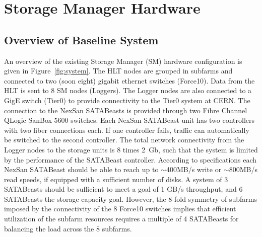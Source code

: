 
\section{\label{sec:stohard}Storage Manager Hardware}  %

\subsection{Overview of Baseline System} 
An overview of the existing  Storage Manager (SM) hardware configuration 
is given in Figure~\ref{fig:system}. 
The HLT nodes are grouped in subfarms and connected to two (soon eight) 
gigabit ethernet switches (Force10). 
Data from the HLT is sent to 8 SM nodes (Loggers). 
The Logger nodes are also connected to a GigE switch (Tier0) to provide connectivity 
to the Tier0 system at CERN.
The connection to the NexSan SATABeasts is provided through two Fibre Channel QLogic SanBox 5600 
switches. Each NexSan SATABeast unit has two controllers with two fiber connections each. 
If one controller fails, traffic can automatically be switched to the second controller. 
The total network connectivity from the Logger nodes to the storage units is 8 times 2~Gb, 
such that the system is limited by the performance of the SATABeast controller. 
According to specifications each NexSan SATABeast should be able to reach up to $\sim$400MB/s write 
or $\sim$800MB/s read speeds, if equipped with a sufficient number of disks.
A system of 3 SATABeasts should be sufficient to meet a goal of 1 GB/s throughput,
and 6  SATABeasts the storage capacity goal.
However, the 8-fold symmetry of subfarms imposed by the connectivity 
of the 8 Force10 switches implies that efficient utilization of the subfarm resources
requires a multiple of 4 SATABeasts for balancing the load across the 8 subfarms.

